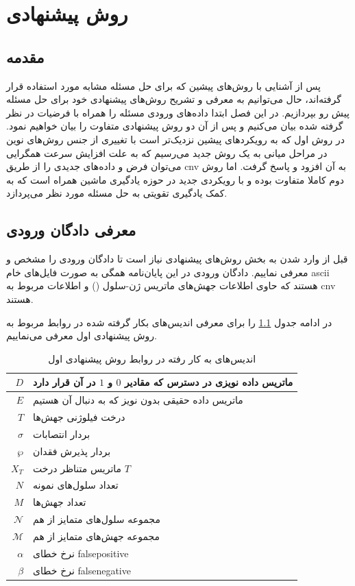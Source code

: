 
\chapter{روش پیشنهادی}
\section{مقدمه} 
پس از آشنایی با روش‌های پیشین که برای حل مسئله مشابه مورد استفاده قرار گرفته‌اند، حال می‌توانیم به معرفی و تشریح روش‌های پیشنهادی خود برای حل مسئله پیش رو بپردازیم. در این فصل ابتدا داده‌های ورودی مسئله را همراه با فرضیات در نظر گرفته شده بیان می‌کنیم و پس از آن دو روش پیشنهادی متفاوت را بیان خواهیم نمود. در روش اول که به رویکردهای پیشین نزدیک‌تر است با تغییری از جنس روش‌‌های نوین در مراحل میانی به یک روش جدید می‌رسیم که به علت افزایش سرعت همگرایی می‌توان فرض و داده‌های جدیدی را از طریق \gls{cnv} به آن افزود و پاسخ گرفت. اما روش دوم کاملا متفاوت بوده و با رویکردی جدید در حوزه یادگیری ماشین همراه است که به کمک یادگیری تقویتی به حل مسئله مورد نظر می‌پردازد.


\section{معرفی دادگان ورودی}
قبل از وارد شدن به بخش روش‌های پیشنهادی نیاز است تا دادگان ورودی را مشخص و معرفی نماییم. دادگان ورودی در این پایان‌نامه همگی به صورت فایل‌های خام \gls{ascii} هستند که حاوی اطلاعات جهش‌های ماتریس ژن-سلول () و اطلاعات مربوط به \gls{cnv} هستند.

در ادامه جدول
\ref{tab:ch_pm:firstpmIndices}
را برای معرفی اندیس‌های بکار گرفته شده در روابط مربوط به روش پیشنهادی اول معرفی می‌نماییم.

	\begin{table}[ht]
	\caption{اندیس‌های به کار رفته در روابط روش پیشنهادی اول}
	\label{tab:ch_pm:firstpmIndices}
	\centering
	\onehalfspacing
	\begin{tabularx}{0.9\textwidth}{|r|X|}
		\hline
		$D$	& ماتریس داده نویزی در دسترس که مقادیر $0$ و $1$ در آن قرار دارد \\
		\hline
		$E$	& ماتریس داده حقیقی بدون نویز که به دنبال آن هستیم \\
		\hline
		$T$	& درخت فیلوژنی جهش‌ها \\
		\hline
		$\sigma$	 & بردار انتصابات \\
		\hline
		$\wp$ & بردار پذیرش فقدان$  $ \\
		\hline
		$X_T$	& ماتریس متناظر درخت $T$ \\
		\hline
		$N$	& تعداد سلول‌های نمونه \\
		\hline
		$M$	& تعداد جهش‌ها \\
		\hline
		$\mathcal{N}$ & مجموعه سلول‌های متمایز از هم \\
		\hline
		$\mathcal{M}$ & مجموعه جهش‌های متمایز از هم \\
		\hline
		$\alpha$	&  نرخ خطای \gls{falsepositive} \\
		\hline
		$\beta$	& نرخ خطای \gls{falsenegative} \\
		\hline
	\end{tabularx}
\end{table}



